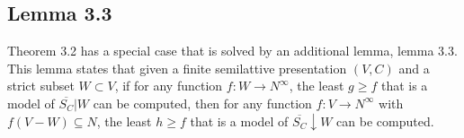 \subsection{Lemma 3.3}

Theorem 3.2 has a special case that is solved by an additional lemma,
lemma 3.3. This lemma states that given a finite semilattive presentation
$(V, C)$ and a strict subset $W \subset V$, if for any function
$f : W \rightarrow N^{\infty}$, the least $g \ge f$ that is a model of
$\overline{S_C}|W$ can be computed, then for any function
$f : V \rightarrow N^{\infty}$ with $f(V - W) \subseteq N$,
the least $h \ge f$ that is a model of $\overline{S_C}\downarrow W$ can be computed.
